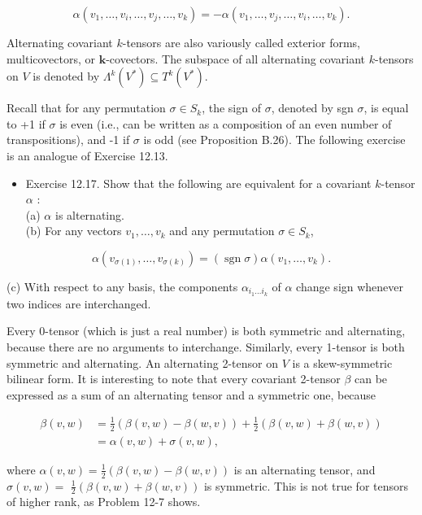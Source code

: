 \documentclass[10pt, letterpaper]{article}
\begin{document}
$$
\alpha\left(v_{1}, \ldots, v_{i}, \ldots, v_{j}, \ldots, v_{k}\right)=-\alpha\left(v_{1}, \ldots, v_{j}, \ldots, v_{i}, \ldots, v_{k}\right) .
$$

Alternating covariant $k$-tensors are also variously called exterior forms, multicovectors, or $\boldsymbol{k}$-covectors. The subspace of all alternating covariant $k$-tensors on $V$ is denoted by $\Lambda^{k}\left(V^{*}\right) \subseteq T^{k}\left(V^{*}\right)$.

Recall that for any permutation $\sigma \in S_{k}$, the sign of $\sigma$, denoted by sgn $\sigma$, is equal to +1 if $\sigma$ is even (i.e., can be written as a composition of an even number of transpositions), and -1 if $\sigma$ is odd (see Proposition B.26). The following exercise is an analogue of Exercise 12.13.

\begin{itemize}
  \item Exercise 12.17. Show that the following are equivalent for a covariant $k$-tensor $\alpha$ :\\
(a) $\alpha$ is alternating.\\
(b) For any vectors $v_{1}, \ldots, v_{k}$ and any permutation $\sigma \in S_{k}$,
\end{itemize}

$$
\alpha\left(v_{\sigma(1)}, \ldots, v_{\sigma(k)}\right)=(\operatorname{sgn} \sigma) \alpha\left(v_{1}, \ldots, v_{k}\right) .
$$

(c) With respect to any basis, the components $\alpha_{i_{1} \ldots i_{k}}$ of $\alpha$ change sign whenever two indices are interchanged.

Every 0-tensor (which is just a real number) is both symmetric and alternating, because there are no arguments to interchange. Similarly, every 1-tensor is both symmetric and alternating. An alternating 2-tensor on $V$ is a skew-symmetric bilinear form. It is interesting to note that every covariant 2-tensor $\beta$ can be expressed as a sum of an alternating tensor and a symmetric one, because

$$
\begin{aligned}
\beta(v, w) & =\frac{1}{2}(\beta(v, w)-\beta(w, v))+\frac{1}{2}(\beta(v, w)+\beta(w, v)) \\
& =\alpha(v, w)+\sigma(v, w),
\end{aligned}
$$

where $\alpha(v, w)=\frac{1}{2}(\beta(v, w)-\beta(w, v))$ is an alternating tensor, and $\sigma(v, w)=$ $\frac{1}{2}(\beta(v, w)+\beta(w, v))$ is symmetric. This is not true for tensors of higher rank, as Problem 12-7 shows.
\end{document}
